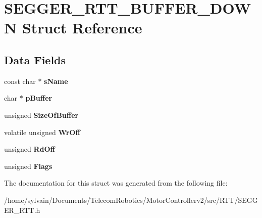 \hypertarget{structSEGGER__RTT__BUFFER__DOWN}{}\section{S\+E\+G\+G\+E\+R\+\_\+\+R\+T\+T\+\_\+\+B\+U\+F\+F\+E\+R\+\_\+\+D\+O\+WN Struct Reference}
\label{structSEGGER__RTT__BUFFER__DOWN}
\subsection*{Data Fields}
\begin{DoxyCompactItemize}
\item 
\hypertarget{structSEGGER__RTT__BUFFER__DOWN_a5cca21c6a1efeb5fb1c8a4fbf9fcdf84}{}\label{structSEGGER__RTT__BUFFER__DOWN_a5cca21c6a1efeb5fb1c8a4fbf9fcdf84} 
const char $\ast$ {\bfseries s\+Name}
\item 
\hypertarget{structSEGGER__RTT__BUFFER__DOWN_ada5ecc573d5e0ae1a0f813a1c24156f7}{}\label{structSEGGER__RTT__BUFFER__DOWN_ada5ecc573d5e0ae1a0f813a1c24156f7} 
char $\ast$ {\bfseries p\+Buffer}
\item 
\hypertarget{structSEGGER__RTT__BUFFER__DOWN_ab9162c01b40361abcfe36898c9670741}{}\label{structSEGGER__RTT__BUFFER__DOWN_ab9162c01b40361abcfe36898c9670741} 
unsigned {\bfseries Size\+Of\+Buffer}
\item 
\hypertarget{structSEGGER__RTT__BUFFER__DOWN_a3cb6a09b71f1910b8eb92f97f1c1ace0}{}\label{structSEGGER__RTT__BUFFER__DOWN_a3cb6a09b71f1910b8eb92f97f1c1ace0} 
volatile unsigned {\bfseries Wr\+Off}
\item 
\hypertarget{structSEGGER__RTT__BUFFER__DOWN_ae16253ec1c01af1ea4da2ccdb4b2fcbc}{}\label{structSEGGER__RTT__BUFFER__DOWN_ae16253ec1c01af1ea4da2ccdb4b2fcbc} 
unsigned {\bfseries Rd\+Off}
\item 
\hypertarget{structSEGGER__RTT__BUFFER__DOWN_a9b60add7975e43598a08d5cf528245f7}{}\label{structSEGGER__RTT__BUFFER__DOWN_a9b60add7975e43598a08d5cf528245f7} 
unsigned {\bfseries Flags}
\end{DoxyCompactItemize}


The documentation for this struct was generated from the following file\+:\begin{DoxyCompactItemize}
\item 
/home/sylvain/\+Documents/\+Telecom\+Robotics/\+Motor\+Controllerv2/src/\+R\+T\+T/S\+E\+G\+G\+E\+R\+\_\+\+R\+T\+T.\+h\end{DoxyCompactItemize}
